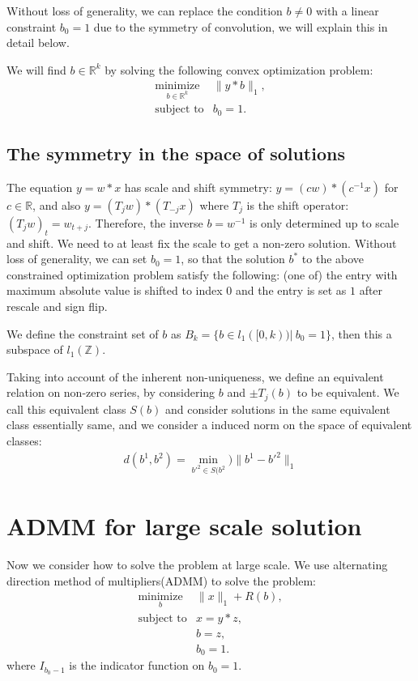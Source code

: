 \documentclass[letter, 10pt]{article}
\numberwithin{equation}{section}
\begin{document}
Without loss of generality, we can replace the condition $b \neq 0$ with a linear constraint 
$b_0 =1$ due to the symmetry of convolution, we will explain this in detail below.

We will find $b \in \mathbb{R}^k$ by solving  the following convex optimization problem:
 \begin{eqnarray*}
\underset{b\in \mathbb{R}^k}{\mbox{minimize}}& \|y*b\|_1 ,\\
\mbox{subject to}& b_0 =1.
 \end{eqnarray*}
 



\subsection{The symmetry in the space of solutions }
The equation $y = w * x$ has scale and shift symmetry:
$y = (cw) *(c^{-1}x)$ for $c\in \mathbb{R}$, and also $y = (T_jw) *(T_{-j}x)$ where $T_j$ is the shift operator: $(T_jw)_t = w_{t+j}$.  Therefore, the inverse $b = w^{-1}$ is only determined up to scale and shift. We need to at least fix the scale to get a non-zero solution. Without loss of generality, we can set $b_0 =1$, so that the solution $b^*$ to the above constrained optimization problem satisfy the following: (one of) the entry with maximum absolute value is shifted to index $0$ and the entry is set as $1$ after rescale and sign flip. 

We define the constraint set of $b$ as $B_{k} = \{b\in l_1( [0, k)) |\  b_0 =1\}$, then this a subspace of  $l_1( \mathbb{Z})$.

Taking into account of the inherent non-uniqueness, we define an equivalent relation on non-zero series, by considering $b$ and $\pm T_j(b) $ to be equivalent. We call this equivalent class $S(b)$ and consider solutions in the same equivalent class essentially same, and we consider a induced norm on the space of equivalent classes:
 \begin{eqnarray*}
d(b^1, b^2) = \min_{b'^2 \in S({b^2}}) \|b^1 - b'^2\|_1
 \end{eqnarray*}
 
 
 

 
\section{ADMM for large scale solution}
Now we consider how to solve the problem at large scale.
We use alternating direction method of multipliers(ADMM) to solve the problem:
 \begin{eqnarray*}
\underset{b}{\mbox{minimize}}& \|x\|_1 + R(b),\\
\mbox{subject to}& x = y*z, \\
& b = z, \\
& b_0 =1.
 \end{eqnarray*}
 where $I_{b_0-1}$ is the indicator function on $b_0 =1.$
 
\end{document}

